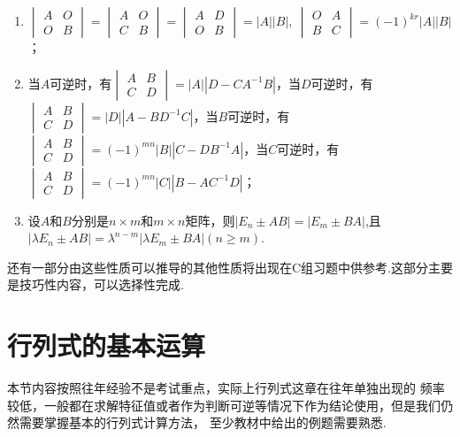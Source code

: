 \begin{enumerate}
    \item $\begin{vmatrix}
        A & O \\ O & B
    \end{vmatrix} = \begin{vmatrix}
        A & O \\ C & B
    \end{vmatrix} = \begin{vmatrix}
        A & D \\ O & B
    \end{vmatrix} = |A||B|,\ \begin{vmatrix}
        O & A \\ B & C
    \end{vmatrix} = (-1)^{kr}|A||B|$；

    \item 当$A$可逆时，有$\begin{vmatrix}
        A & B \\ C & D
    \end{vmatrix} = |A||D-CA^{-1}B|$，当$D$可逆时，有
    $\begin{vmatrix}
        A & B \\ C & D
    \end{vmatrix} = |D||A-BD^{-1}C|$，当$B$可逆时，有
    $\begin{vmatrix}
        A & B \\ C & D
    \end{vmatrix} = (-1)^{mn}|B||C-DB^{-1}A|$，当$C$可逆时，有
    $\begin{vmatrix}
        A & B \\ C & D
    \end{vmatrix} = (-1)^{mn}|C||B-AC^{-1}D|$；

    \item 设$A$和$B$分别是$n \times m$和$m \times n$矩阵，则$|E_n \pm AB|=|E_m \pm BA|$,且
    $|\lambda E_n \pm AB|=\lambda^{n-m}|\lambda E_m \pm BA|(n \geqslant m)$.
\end{enumerate}

还有一部分由这些性质可以推导的其他性质将出现在C组习题中供参考.这部分主要是技巧性内容，可以选择性完成.

\section{行列式的基本运算}
本节内容按照往年经验不是考试重点，实际上行列式这章在往年单独出现的
频率较低，一般都在求解特征值或者作为判断可逆等情况下作为结论使用，但是我们仍然需要掌握基本的行列式计算方法，
至少教材中给出的例题需要熟悉.

